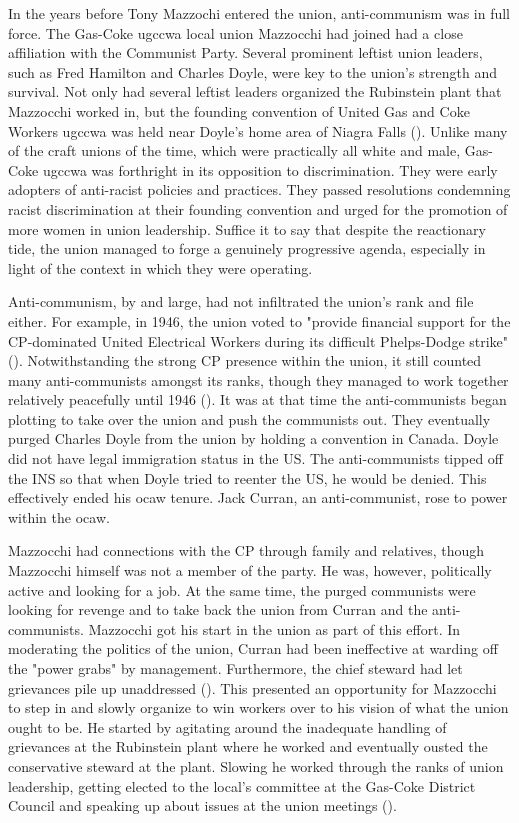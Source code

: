 \documentclass[12pt]{article}
\begin{document}
In the years before Tony Mazzochi entered the union, anti-communism was in full force. The Gas-Coke \acrshort{ugccwa} local union Mazzocchi had joined had a close affiliation with the Communist Party. Several prominent leftist union leaders, such as Fred Hamilton and Charles Doyle, were key to the union’s strength and survival. Not only had several leftist leaders organized the Rubinstein plant that Mazzocchi worked in, but the founding convention of United Gas and Coke Workers \acrshort{ugccwa} was held near Doyle’s home area of Niagra Falls (\cite[81]{leopoldManWhoHated2007}). Unlike many of the craft unions of the time, which were practically all white and male, Gas-Coke \acrshort{ugccwa} was forthright in its opposition to discrimination. They were early adopters of anti-racist policies and practices. They passed resolutions condemning racist discrimination at their founding convention and urged for the promotion of more women in union leadership. Suffice it to say that despite the reactionary tide, the union managed to forge a genuinely progressive agenda, especially in light of the context in which they were operating.

Anti-communism, by and large, had not infiltrated the union’s rank and file either. For example, in 1946, the union voted to "provide financial support for the CP-dominated United Electrical Workers during its difficult Phelps-Dodge strike" (\cite[84]{leopoldManWhoHated2007}). Notwithstanding the strong CP presence within the union, it still counted many anti-communists amongst its ranks, though they managed to work together relatively peacefully until 1946 (\cite[84]{leopoldManWhoHated2007}). It was at that time the anti-communists began plotting to take over the union and push the communists out. They eventually purged Charles Doyle from the union by holding a convention in Canada. Doyle did not have legal immigration status in the US. The anti-communists tipped off the INS so that when Doyle tried to reenter the US, he would be denied. This effectively ended his \acrshort{ocaw} tenure. Jack Curran, an anti-communist, rose to power within the \acrshort{ocaw}.

Mazzocchi had connections with the CP through family and relatives, though Mazzocchi himself was not a member of the party. He was, however, politically active and looking for a job. At the same time, the purged communists were looking for revenge and to take back the union from Curran and the anti-communists. Mazzocchi got his start in the union as part of this effort. In moderating the politics of the union, Curran had been ineffective at warding off the "power grabs" by management. Furthermore, the chief steward had let grievances pile up unaddressed (\cite[90]{leopoldManWhoHated2007}). This presented an opportunity for Mazzocchi to step in and slowly organize to win workers over to his vision of what the union ought to be. He started by agitating around the inadequate handling of grievances at the Rubinstein plant where he worked and eventually ousted the conservative steward at the plant. Slowing he worked through the ranks of union leadership, getting elected to the local’s committee at the Gas-Coke District Council and speaking up about issues at the union meetings (\cite[97--98]{leopoldManWhoHated2007}). 
\end{document}
